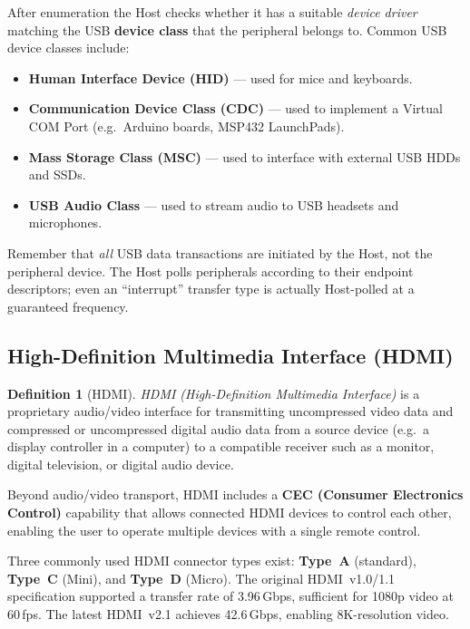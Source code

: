 \documentclass[11pt, a4paper, notitlepage]{report}
\theoremstyle{definition}
\newtheorem{definition}[theorem]{Definition}
\theoremstyle{remark}
\theoremstyle{definition}
\begin{document}
After enumeration the Host checks whether it has a suitable \emph{device driver} matching the USB \textbf{device class} that the peripheral belongs to. Common USB device classes include:

\begin{itemize}
  \item \textbf{Human Interface Device (HID)} --- used for mice and keyboards.
  \item \textbf{Communication Device Class (CDC)} --- used to implement a Virtual COM Port (e.g.\ Arduino boards, MSP432 LaunchPads).
  \item \textbf{Mass Storage Class (MSC)} --- used to interface with external USB HDDs and SSDs.
  \item \textbf{USB Audio Class} --- used to stream audio to USB headsets and microphones.
\end{itemize}

\begin{examtip}[title={Exam Tip: USB Host-Initiated Transactions}]
  Remember that \emph{all} USB data transactions are initiated by the Host, not the peripheral device. The Host polls peripherals according to their endpoint descriptors; even an ``interrupt'' transfer type is actually Host-polled at a guaranteed frequency.
\end{examtip}

\subsection{High-Definition Multimedia Interface (HDMI)}
\label{sec:hdmi}

\begin{definition}[HDMI]
  \label{def:hdmi}
  \emph{HDMI (High-Definition Multimedia Interface)} is a proprietary audio/video interface for transmitting uncompressed video data and compressed or uncompressed digital audio data from a source device (e.g.\ a display controller in a computer) to a compatible receiver such as a monitor, digital television, or digital audio device.
\end{definition}

Beyond audio/video transport, HDMI includes a \textbf{CEC (Consumer Electronics Control)} capability that allows connected HDMI devices to control each other, enabling the user to operate multiple devices with a single remote control.

Three commonly used HDMI connector types exist: \textbf{Type~A} (standard), \textbf{Type~C} (Mini), and \textbf{Type~D} (Micro). The original HDMI~v1.0/1.1 specification supported a transfer rate of 3.96\,Gbps, sufficient for 1080p video at 60\,fps. The latest HDMI~v2.1 achieves 42.6\,Gbps, enabling 8K-resolution video.
\end{document}
